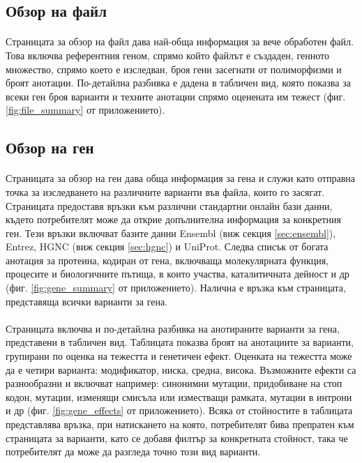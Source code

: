 \documentclass[pdftex,cyrillic,14pt,a4page,twoside,openright]{extreport}
\begin{document}
\subsection{Обзор на файл}
\paragraph{}
Страницата за обзор на файл дава най-обща информация за вече обработен файл. Това включва референтния геном, спрямо който файлът е създаден, генното множество, спрямо което е изследван, броя гени засегнати от полиморфизми и броят анотации. По-детайлна разбивка е дадена в табличен вид, която показва за всеки ген броя варианти и техните анотации спрямо оценената им тежест (фиг. \ref{fig:file_summary} от приложението).


\subsection{Обзор на ген}
\paragraph{}
Страницата за обзор на ген дава обща информация за гена и служи като отправна точка за изследването на различните варианти във файла, които го засягат. Страницата предоставя връзки към различни стандартни онлайн бази данни, където потребителят може да открие допълнителна информация за конкретния ген. Тези връзки включват базите данни Ensembl (виж секция \ref{sec:ensembl}), Entrez, HGNC (виж секция \ref{sec:hgnc}) и UniProt. Следва списък от богата анотация за протеина, кодиран от гена, включваща молекулярната функция, процесите и биологичните пътища, в които участва, каталитичната дейност и др (фиг. \ref{fig:gene_summary} от приложението). Налична е връзка към страницата, представяща всички варианти за гена.

\paragraph{}
Страницата включва и по-детайлна разбивка на анотираните варианти за гена, представени в табличен вид. Таблицата показва броят на анотациите за варианти, групирани по оценка на тежестта и генетичен ефект. Оценката на тежестта може да е четири варианта: модификатор, ниска, средна, висока. Възможните ефекти са разнообразни и включват например: синонимни мутации, придобиване на стоп кодон, мутации, изменящи смисъла или изместващи рамката, мутации в интрони и др (фиг. \ref{fig:gene_effects} от приложението). Всяка от стойностите в таблицата представлява връзка, при натискането на която, потребителят бива препратен към страницата за варианти, като се добавя филтър за конкретната стойност, така че потребителят да може да разгледа точно този вид варианти.
\end{document}
